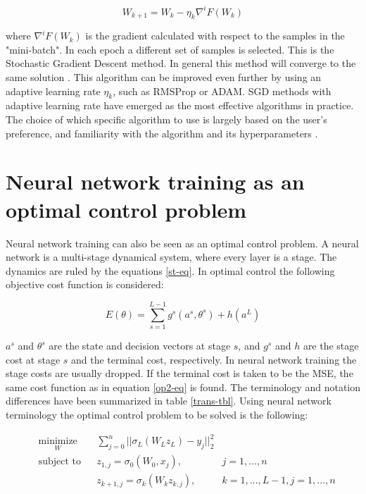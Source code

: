 \begin{equation}
W_{k+1} = W_{k} - \eta_k\nabla^i F(W_k)
\label{gd-eq}
\end{equation}

where $\nabla^i F(W_k)$ is the gradient calculated with respect to the samples in the "mini-batch". In each epoch a different set of samples is selected. This is the Stochastic Gradient Descent method. In general this method will converge to the same solution \cite{Bottou2005}. This algorithm can be improved even further by using an adaptive learning rate $\eta_k$, such as RMSProp or ADAM. SGD methods with adaptive learning rate have emerged as the most effective algorithms in practice. The choice of which specific algorithm to use is largely based on the user's preference, and familiarity with the algorithm and its hyperparameters \cite{Goodfellow-et-al-2016}.

\section{Neural network training as an optimal control problem}
Neural network training can also be seen as an optimal control problem. A neural network is a multi-stage dynamical system, where every layer is a stage. The dynamics are ruled by the equations \ref{st-eq}. In optimal control the following objective cost function is considered:

\begin{equation}
E(\theta) = \sum\limits_{s=1}^{L-1}g^s(a^s,\theta^s) + h(a^L)
\end{equation}


$a^s$ and $\theta^s$ are the state and decision vectors at stage $s$, and $g^s$ and $h$ are the stage cost at stage $s$ and the terminal cost, respectively. In neural network training the stage costs are usually dropped. If the terminal cost is taken to be the MSE, the same cost function as in equation \ref{op2-eq} is found. The terminology and notation differences have been summarized in table \ref{trans-tbl}. Using neural network terminology the optimal control problem to be solved is the following:

\begin{equation}
	\begin{aligned}
	& \underset{W}{\text{minimize}}
	& & \sum\limits_{j=0}^{n}||\sigma_L(W_Lz_L) - y_j||^2_2 \\
	& \text{subject to}
	& & z_{1,j} = \sigma_0(W_0,x_j), &j = 1,\ldots,n \\
	& & & z_{k+1,j} = \sigma_k(W_kz_{k,j}), &k = 1,\ldots,L-1,j = 1,\ldots,n
	\end{aligned}
	\label{ocp-eq}
\end{equation}

